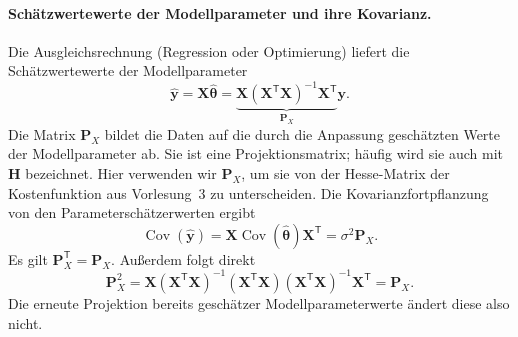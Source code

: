 \paragraph{Schätzwertewerte der Modellparameter und ihre Kovarianz.}
Die Ausgleichsrechnung (Regression oder Optimierung) liefert die Schätzwertewerte der Modellparameter
\begin{equation}
\widehat{\mathbf y}
=\mathbf X\widehat{\boldsymbol\theta}
=\underbrace{\mathbf X(\mathbf X^\mathsf T\mathbf X)^{-1}
\mathbf X^\mathsf T}_{\displaystyle\mathbf P_X}\mathbf y.
\label{KonzepteProjektionsmatrix}
\end{equation}
Die Matrix $\mathbf P_X$ bildet die Daten auf die durch die Anpassung geschätzten Werte der Modellparameter ab.
Sie ist eine Projektionsmatrix; häufig wird sie auch mit
$\mathbf H$ bezeichnet. Hier verwenden wir $\mathbf P_X$, um sie von
der Hesse-Matrix der Kostenfunktion aus Vorlesung~3 zu unterscheiden.
Die Kovarianzfortpflanzung von den Parameterschätzerwerten ergibt
\begin{equation}
\operatorname{Cov}(\widehat{\mathbf y})
=\mathbf X\operatorname{Cov}(\widehat{\boldsymbol\theta})\mathbf X^\mathsf T
=\sigma^2\mathbf P_X.
\end{equation}
Es gilt $\mathbf P_X^\mathsf T=\mathbf P_X$. Außerdem folgt direkt
\begin{equation}
\mathbf P_X^2
=\mathbf X(\mathbf X^\mathsf T\mathbf X)^{-1}
(\mathbf X^\mathsf T\mathbf X)
(\mathbf X^\mathsf T\mathbf X)^{-1}\mathbf X^\mathsf T
=\mathbf P_X.
\end{equation}
Die erneute Projektion bereits geschätzer Modellparameterwerte ändert diese
also nicht.

